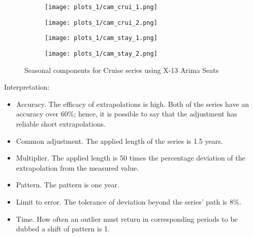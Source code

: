 \documentclass[11pt]{article}
\begin{document}
\begin{figure}[H]
    \centering
    \begin{subfigure}[t]{0.45\textwidth}
         \texttt{[image: plots\_1/cam\_crui\_1.png]}
    \end{subfigure}
    \begin{subfigure}[t]{0.45\textwidth}
          \texttt{[image: plots\_1/cam\_crui\_2.png]}
    \end{subfigure}
    \begin{subfigure}[t]{0.45\textwidth}
         \texttt{[image: plots\_1/cam\_stay\_1.png]}
    \end{subfigure}
    \begin{subfigure}[t]{0.45\textwidth}
          \texttt{[image: plots\_1/cam\_stay\_2.png]}
    \end{subfigure}
    \caption{Seasonal components for Cruise series using X-13 Arima Seats}
    \label{fig:campletadj1}
\end{figure}

Interpretation:
\begin{itemize}
\item Accuracy. The efficacy of extrapolations is high. Both of the series have an accuracy over 60\%; hence, it is possible to say that the adjustment has reliable short extrapolations.
\item Common adjustment. The applied length of the series is 1.5 years.
\item Multiplier. The applied length is 50 times the percentage deviation of the extrapolation from the measured value.
\item Pattern. The pattern is one year.
\item Limit to error. The tolerance of deviation beyond the series' path is 8\%.
\item Time. How often an outlier must return in corresponding periods to be dubbed a shift of pattern is 1.
\end{itemize}
\end{document}
